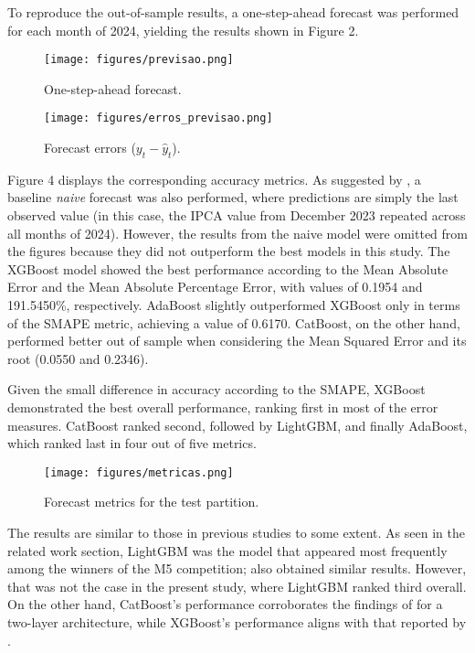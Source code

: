 To reproduce the out-of-sample results, a one-step-ahead forecast was performed for each month of 2024, yielding the results shown in Figure 2.
\begin{figure}[h!]
    \centering
    \texttt{[image: figures/previsao.png]} %
    \caption{One-step-ahead forecast.}
    \label{fig:example}
\end{figure}

\begin{figure}[h!]
    \centering
    \texttt{[image: figures/erros\_previsao.png]} %
    \caption{Forecast errors ($y_t-\hat{y}_t$).}
    \label{fig:example}
\end{figure}

Figure 4 displays the corresponding accuracy metrics. As suggested by \cite{hyndman2018forecasting}, a baseline \textit{naive} forecast was also performed, where predictions are simply the last observed value (in this case, the IPCA value from December 2023 repeated across all months of 2024). However, the results from the naive model were omitted from the figures because they did not outperform the best models in this study. The XGBoost model showed the best performance according to the Mean Absolute Error and the Mean Absolute Percentage Error, with values of 0.1954 and 191.5450\%, respectively. AdaBoost slightly outperformed XGBoost only in terms of the SMAPE metric, achieving a value of 0.6170. CatBoost, on the other hand, performed better out of sample when considering the Mean Squared Error and its root (0.0550 and 0.2346).

Given the small difference in accuracy according to the SMAPE, XGBoost demonstrated the best overall performance, ranking first in most of the error measures. CatBoost ranked second, followed by LightGBM, and finally AdaBoost, which ranked last in four out of five metrics.

\begin{figure}[h!]
    \centering
    \texttt{[image: figures/metricas.png]} %
    \caption{Forecast metrics for the test partition.}
    \label{fig:example}
\end{figure}

The results are similar to those in previous studies to some extent. As seen in the related work section, LightGBM was the model that appeared most frequently among the winners of the M5 competition; \cite{bentejac2021comparative} also obtained similar results. However, that was not the case in the present study, where LightGBM ranked third overall. On the other hand, CatBoost's performance corroborates the findings of \cite{XIANGCATBOOST} for a two-layer architecture, while XGBoost's performance aligns with that reported by \cite{sousa2023comparing}.

